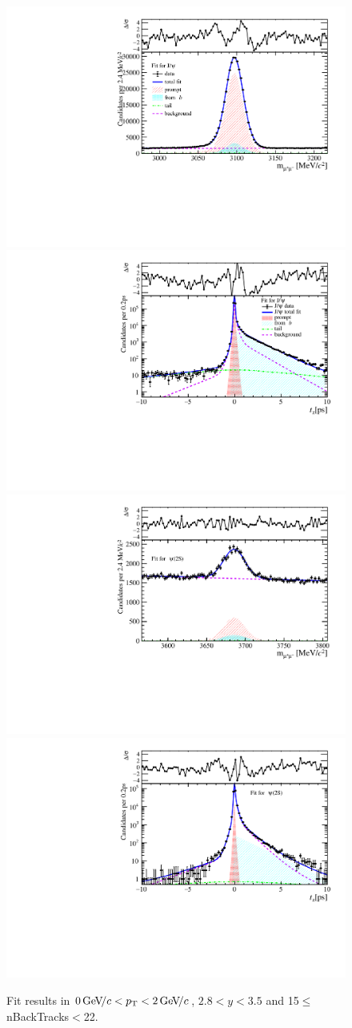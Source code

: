 \begin{figure}[H]
\begin{center}
\includegraphics[width=0.47\linewidth]{pdf/Jpsi/drawmassB/n3y2pt1.pdf}
\includegraphics[width=0.47\linewidth]{pdf/Jpsi/2DFitB/n3y2pt1.pdf}
\vspace*{-0.5cm}
\includegraphics[width=0.47\linewidth]{pdf/Psi2S/drawmassB/n3y2pt1.pdf}
\includegraphics[width=0.47\linewidth]{pdf/Psi2S/2DFitB/n3y2pt1.pdf}
\vspace*{-0.5cm}
\end{center}
\caption{Fit results in $0\text{\,Ge\kern -0.1em V\!/}c<p_{\mathrm{T}}<2\text{\,Ge\kern -0.1em V\!/}c$, $2.8<y<3.5$ and 15$\leq$nBackTracks$<$22.}
\label{Fitn3y2pt1}
\end{figure}
